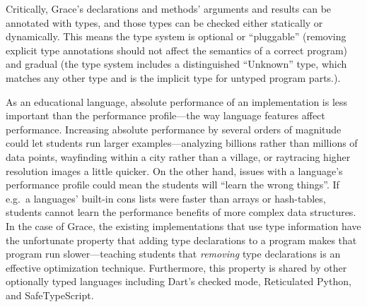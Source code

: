 Critically, Grace's declarations and methods' arguments
and results can be annotated with types, and those types can be  checked
either statically or dynamically. This means the type system is
optional or ``pluggable''\citep{GiladPluggable2004} (removing explicit
type annotations should not affect the semantics of a correct
program\citep{Siek2015}) and gradual (the type system
includes a distinguished ``Unknown'' type, which matches any other type
and is the implicit type for untyped program parts.).

As an educational language\citep{panel}, absolute performance of an
implementation is less important than the performance profile---the
way language features affect performance.  Increasing absolute
performance by several orders of magnitude could let students run
larger examples---analyzing billions rather than millions of data
points, wayfinding within a city rather than a village, or raytracing
higher resolution images a little quicker.  On the other hand, issues
with a language's performance profile could mean the students will
``learn the wrong things''.  If e.g.\ a languages' built-in cons lists
were faster than arrays or hash-tables, students cannot learn the
performance benefits of more complex data structures. In the case of
Grace, the existing implementations that use type information
have the unfortunate property that
adding type declarations to a program makes that program run slower---teaching students that \emph{removing} type declarations is an
effective optimization technique.
Furthermore, this property is shared
by other optionally typed languages including
Dart's checked mode\citep{dartbook},
Reticulated Python\citep{reticPython2014,Greenman2018},
and SafeTypeScript\citep{Richards2017}.




